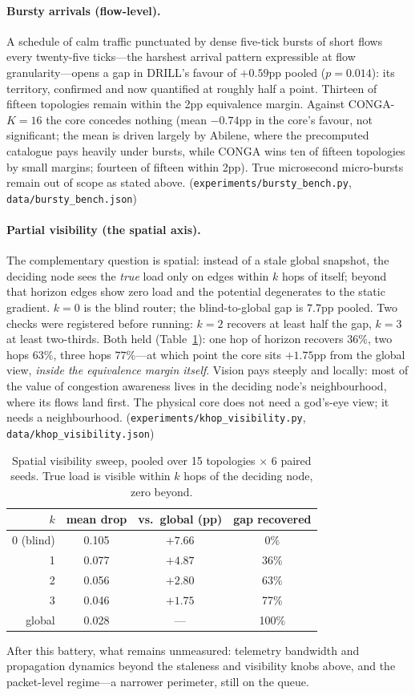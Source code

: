 \paragraph{Bursty arrivals (flow-level).}
A schedule of calm traffic punctuated by dense five-tick bursts of short
flows every twenty-five ticks---the harshest arrival pattern expressible at
flow granularity---opens a gap in DRILL's favour of $+0.59$pp pooled
($p=0.014$): its territory, confirmed and now quantified at roughly half a
point. Thirteen of fifteen topologies remain within the 2pp equivalence
margin. Against CONGA-$K{=}16$ the core concedes nothing (mean $-0.74$pp in
the core's favour, not significant; the mean is driven largely by Abilene,
where the precomputed catalogue pays heavily under bursts, while CONGA wins
ten of fifteen topologies by small margins; fourteen of fifteen within
2pp). True microsecond micro-bursts remain out of scope as stated above.
(\texttt{experiments/bursty\_bench.py}, \texttt{data/bursty\_bench.json})

\paragraph{Partial visibility (the spatial axis).}
The complementary question is spatial: instead of a stale global snapshot,
the deciding node sees the \emph{true} load only on edges within $k$ hops
of itself; beyond that horizon edges show zero load and the potential
degenerates to the static gradient. $k{=}0$ is the blind router; the
blind-to-global gap is $7.7$pp pooled. Two checks were registered before
running: $k{=}2$ recovers at least half the gap, $k{=}3$ at least
two-thirds. Both held (Table~\ref{tab:khop}): one hop of horizon recovers
$36\%$, two hops $63\%$, three hops $77\%$---at which point the core sits
$+1.75$pp from the global view, \emph{inside the equivalence margin
itself}. Vision pays steeply and locally: most of the value of congestion
awareness lives in the deciding node's neighbourhood, where its flows
land first. The physical core does not need a god's-eye view; it needs a
neighbourhood. (\texttt{experiments/khop\_visibility.py},
\texttt{data/khop\_visibility.json})

\begin{table}[t]
\centering
\caption{Spatial visibility sweep, pooled over 15 topologies $\times$ 6
paired seeds. True load is visible within $k$ hops of the deciding node,
zero beyond.}
\label{tab:khop}
\begin{tabular}{rccc}
\toprule
$k$ & mean drop & vs.\ global (pp) & gap recovered \\
\midrule
0 (blind) & 0.105 & $+7.66$ & 0\% \\
1         & 0.077 & $+4.87$ & 36\% \\
2         & 0.056 & $+2.80$ & 63\% \\
3         & 0.046 & $+1.75$ & 77\% \\
global    & 0.028 & ---     & 100\% \\
\bottomrule
\end{tabular}
\end{table}

\medskip
\noindent After this battery, what remains unmeasured: telemetry bandwidth
and propagation dynamics beyond the staleness and visibility knobs above,
and the packet-level regime---a narrower perimeter, still on the queue.
